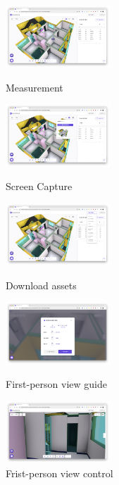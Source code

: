 \begin{itemize}
\begin{itemize}[label=$\star$]
\begin{figure}[!ht]
\begin{fullwidth}
{			      }\qquad
			      \parbox{0.35\textwidth}{
				      \centering
				      \includegraphics[width=0.35\textwidth]{images/builderhub-curation-measurement.png}
				      \caption*{Measurement}
			      }\qquad
			      \parbox{0.35\textwidth}{
				      \centering
				      \includegraphics[width=0.35\textwidth]{images/builderhub-curation-screenshot.png}
				      \caption*{Screen Capture}
			      }
			      \parbox{0.35\textwidth}{
				      \centering
				      \includegraphics[width=0.35\textwidth]{images/builderhub-curation-download.png}
				      \caption*{Download assets}
			      }\qquad
			      \parbox{0.35\textwidth}{
				      \centering
				      \includegraphics[width=0.35\textwidth]{images/builderhub-curation-first-person-view-1.png}
				      \caption*{First-person view guide}
			      }\qquad
			      \parbox{0.35\textwidth}{
				      \centering
				      \includegraphics[width=0.35\textwidth]{images/builderhub-curation-first-person-view-2.png}
				      \caption*{Frist-person view control}
}
\end{fullwidth}
\end{figure}
\end{itemize}
\end{itemize}
